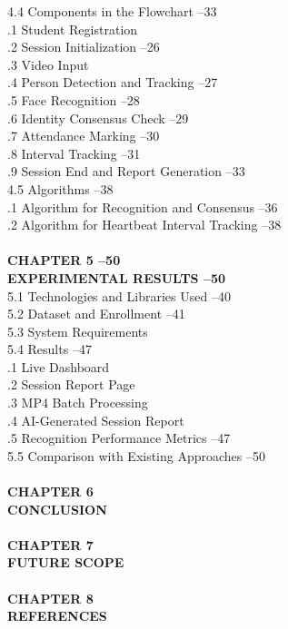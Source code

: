 \documentclass{report}
\begin{document}
\begin{tabbing}
    4.4 \> Components in the Flowchart \> --33 \\[0.2cm]
    .1 Student Registration \>  \\[0.2cm]
    .2 Session Initialization \> --26 \\[0.2cm]
    .3 Video Input \>  \\[0.2cm]
    .4 Person Detection and Tracking \> --27 \\[0.2cm]
    .5 Face Recognition \> --28 \\[0.2cm]
    .6 Identity Consensus Check \> --29 \\[0.2cm]
    .7 Attendance Marking \> --30 \\[0.2cm]
    .8 Interval Tracking \> --31 \\[0.2cm]
    .9 Session End and Report Generation \> --33 \\[0.2cm]
    4.5 \> Algorithms \> --38 \\[0.2cm]
    .1 Algorithm for Recognition and Consensus \> --36 \\[0.2cm]
    .2 Algorithm for Heartbeat Interval Tracking \> --38 \\[0.2cm]
    \\
    \textbf{CHAPTER 5 \> \> --50} \\[0.2cm]
    \textbf{EXPERIMENTAL RESULTS \> \> --50} \\[0.2cm]
    5.1 \> Technologies and Libraries Used \> --40 \\[0.2cm]
    5.2 \> Dataset and Enrollment \> --41 \\[0.2cm]
    5.3 \> System Requirements \>  \\[0.2cm]
    5.4 \> Results \> --47 \\[0.2cm]
    .1 Live Dashboard \>  \\[0.2cm]
    .2 Session Report Page \>  \\[0.2cm]
    .3 MP4 Batch Processing \>  \\[0.2cm]
    .4 AI-Generated Session Report \>  \\[0.2cm]
    .5 Recognition Performance Metrics \> --47 \\[0.2cm]
    5.5 \> Comparison with Existing Approaches \> --50 \\[0.2cm]
    \\
    \textbf{CHAPTER 6 \> \> } \\[0.2cm]
    \textbf{CONCLUSION \> \> } \\[0.2cm]
    \\
    \textbf{CHAPTER 7 \> \> } \\[0.2cm]
    \textbf{FUTURE SCOPE \> \> } \\[0.2cm]
    \\
    \textbf{CHAPTER 8 \> \> } \\[0.2cm]
    \textbf{REFERENCES \> \> } \\[0.2cm]
\end{tabbing}
\end{document}
